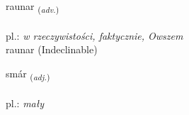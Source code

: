 \documentclass[frontgrid, backgrid]{flacards}\usepackage[]{graphicx}\usepackage[]{xcolor}
\begin{document}

\renewcommand{\flhead}{\vskip5pt \fboxsep=0pt {\small\bfseries\footnotesize Atviksorð | Adverb}}
\renewcommand{\fcfoot}{\vskip5pt \fboxsep=0pt \hspace{2pt}{\small\bfseries\footnotesize 2K}}

\renewcommand{\blhead}{\vskip5pt {\small\bfseries\footnotesize Atviksorð | Adverb }}
\renewcommand{\bcfoot}{\vskip5pt \hspace{2pt}{\small\bfseries\footnotesize 2K}}


{raunar \small{\textsubscript{(\textit{adv.})}} \\[1ex]
\textphonetic{[rœiːnar]} \\
pl.: \emph{w rzeczywistości, faktycznie, Owszem} \\  [2ex]
raunar (Indeclinable)}

\renewcommand{\flhead}{\vskip5pt \fboxsep=0pt {\small\bfseries\footnotesize Lýsingarorð | Adjective}}
\renewcommand{\fcfoot}{\vskip5pt \fboxsep=0pt \hspace{2pt}{\small\bfseries\footnotesize 2K}}

\renewcommand{\blhead}{\vskip5pt {\small\bfseries\footnotesize Lýsingarorð | Adjective }}
\renewcommand{\bcfoot}{\vskip5pt \hspace{2pt}{\small\bfseries\footnotesize 2K}}


{smár \small{\textsubscript{(\textit{adj.})}} \\[1ex] %
\textphonetic{[smauːr]} \\
pl.: \emph{mały} \\  [2ex]
\renewcommand*{\arraystretch}{0.8}
}
\end{document}
